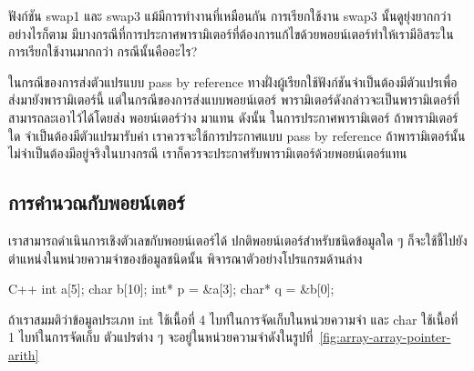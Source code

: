 \begin{quiz}{}
ฟังก์ชัน {\ct swap1} และ {\ct swap3} แม้{\wbr}มี{\wbr}การ{\wbr}ทำงาน{\wbr}ที่{\wbr}เหมือน{\wbr}กัน การ{\wbr}เรียก{\wbr}ใช้{\wbr}งาน{\wbr}
{\ct swap3} นั้น{\wbr}ดู{\wbr}ยุ่งยาก{\wbr}กว่า อย่างไรก็ตาม{\wbr}
มี{\wbr}บาง{\wbr}กรณี{\wbr}ที่{\wbr}การ{\wbr}ประกาศ{\wbr}พารามิเตอร์{\wbr}ที่{\wbr}ต้องการ{\wbr}แก้ไข{\wbr}ด้วย{\wbr}พอยน์เตอร์{\wbr}ทำ{\wbr}ให้{\wbr}เรา{\wbr}มี{\wbr}อิสระ{\wbr}ใน{\wbr}การ{\wbr}เรียก{\wbr}ใช้{\wbr}งาน{\wbr}มาก{\wbr}กว่า กรณี{\wbr}นั้น{\wbr}คือ{\wbr}อะไร?
\end{quiz}
\begin{quizans}
ใน{\wbr}กรณี{\wbr}ของ{\wbr}การ{\wbr}ส่ง{\wbr}ตัวแปร{\wbr}แบบ pass by reference
ทาง{\wbr}ฝั่ง{\wbr}ผู้{\wbr}เรียก{\wbr}ใช้{\wbr}ฟังก์ชัน{\wbr}จำเป็น{\wbr}ต้อง{\wbr}มี{\wbr}ตัวแปร{\wbr}เพื่อ{\wbr}ส่ง{\wbr}มา{\wbr}ยัง{\wbr}พารามิเตอร์{\wbr}นี้{\wbr}
แต่{\wbr}ใน{\wbr}กรณี{\wbr}ของ{\wbr}การ{\wbr}ส่ง{\wbr}แบบ{\wbr}พอยน์เตอร์
พารามิเตอร์{\wbr}ดังกล่าว{\wbr}จะ{\wbr}เป็น{\wbr}พารามิเตอร์{\wbr}ที่{\wbr}สามารถ{\wbr}ละ{\wbr}เอา{\wbr}ไว้{\wbr}ได้{\wbr}โดย{\wbr}ส่ง พอยน์เตอร์ว่าง {}
มา{\wbr}แทน ดังนั้น ใน{\wbr}การ{\wbr}ประกาศ{\wbr}พารามิเตอร์ ถ้า{\wbr}พารามิเตอร์{\wbr}ใด จำเป็น{\wbr}ต้อง{\wbr}มี{\wbr}ตัวแปร{\wbr}มา{\wbr}รับ{\wbr}ค่า{\wbr}
เรา{\wbr}ควร{\wbr}จะ{\wbr}ใช้{\wbr}การ{\wbr}ประกาศ{\wbr}แบบ pass by reference
ถ้า{\wbr}พารามิเตอร์{\wbr}นั้น{\wbr}ไม่{\wbr}จำเป็น{\wbr}ต้อง{\wbr}มี{\wbr}อยู่จริง{\wbr}ใน{\wbr}บาง{\wbr}กรณี{\wbr}
เรา{\wbr}ก็{\wbr}ควร{\wbr}จะ{\wbr}ประกาศ{\wbr}รับ{\wbr}พารามิเตอร์{\wbr}ด้วย{\wbr}พอยน์เตอร์{\wbr}แทน{\wbr}
\end{quizans}

\subsection{การ{\wbr}คำนวณ{\wbr}กับ{\wbr}พอยน์เตอร์}
\label{sect:array-pointer-arith}

เรา{\wbr}สามารถ{\wbr}ดำเนินการ{\wbr}เชิง{\wbr}ตัวเลข{\wbr}กับ{\wbr}พอยน์เตอร์{\wbr}ได้ ปกติ{\wbr}พอยน์เตอร์{\wbr}สำหรับ{\wbr}ชนิด{\wbr}ข้อมูล{\wbr}ใด ๆ
ก็{\wbr}จะ{\wbr}ใช้{\wbr}ชี้{\wbr}ไป{\wbr}ยัง{\wbr}ตำแหน่ง{\wbr}ใน{\wbr}หน่วยความจำ{\wbr}ของ{\wbr}ข้อมูล{\wbr}ชนิด{\wbr}นั้น พิจารณา{\wbr}ตัวอย่าง{\wbr}โปรแกรม{\wbr}ด้าน{\wbr}ล่าง{\wbr}

\latintext
\begin{codelist}{C++}{}
int a[5];
char b[10];
int* p = &a[3];
char* q = &b[0];
\end{codelist}
\thaitext

ถ้า{\wbr}เรา{\wbr}สมมติ{\wbr}ว่า{\wbr}ข้อมูล{\wbr}ประเภท {\ct int} ใช้เนื้อ{\wbr}ที่ 4 ไบท์ใน{\wbr}การ{\wbr}จัด{\wbr}เก็บ{\wbr}ใน{\wbr}หน่วยความจำ และ{\wbr}
{\ct char} ใช้เนื้อ{\wbr}ที่ 1 ไบท์ใน{\wbr}การ{\wbr}จัด{\wbr}เก็บ ตัวแปร{\wbr}ต่าง ๆ
จะ{\wbr}อยู่{\wbr}ใน{\wbr}หน่วยความจำ{\wbr}ดัง{\wbr}ใน{\wbr}รูป{\wbr}ที่~\ref{fig:array-array-pointer-arith}

